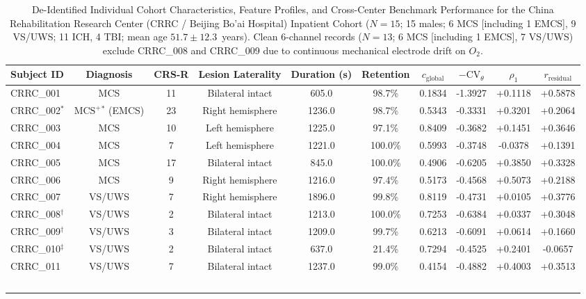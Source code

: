 \begin{table}[!ht]
\centering
\caption{De-Identified Individual Cohort Characteristics, Feature Profiles, and Cross-Center Benchmark Performance for the China Rehabilitation Research Center (CRRC / Beijing Bo'ai Hospital) Inpatient Cohort ($N=15$; 15 males; 6 MCS [including 1 EMCS], 9 VS/UWS; 11 ICH, 4 TBI; mean age $51.7 \pm 12.3$~years). Clean 6-channel records ($N=13$; 6 MCS [including 1 EMCS], 7 VS/UWS) exclude CRRC\_008 and CRRC\_009 due to continuous mechanical electrode drift on $O_2$.}
\label{tab:crrc_patient_cohort}
\vspace{-4pt}
\footnotesize
\renewcommand{\arraystretch}{0.92}
\setlength{\tabcolsep}{3.5pt}
\begin{tabular*}{\linewidth}{@{\extracolsep{\fill}}lccccccccc}
\hline
\textbf{Subject ID} & \textbf{Diagnosis} & \textbf{CRS-R} & \textbf{Lesion Laterality} & \textbf{Duration (s)} & \textbf{Retention} & $c_{\text{global}}$ & $-\mathrm{CV}_\theta$ & $\rho_1$ & $r_{\text{residual}}$ \\
\hline
CRRC\_001 & MCS & 11 & Bilateral intact & 605.0 & 98.7\% & 0.1834 & -1.3927 & +0.1118 & +0.5878 \\
CRRC\_002$^*$ & $\text{MCS}^+$$^*$ (EMCS) & 23 & Right hemisphere & 1236.0 & 98.7\% & 0.5343 & -0.3331 & +0.3201 & +0.2064 \\
CRRC\_003 & MCS & 10 & Left hemisphere & 1225.0 & 97.1\% & 0.8409 & -0.3682 & +0.1451 & +0.3646 \\
CRRC\_004 & MCS & 7 & Left hemisphere & 1221.0 & 100.0\% & 0.5993 & -0.3748 & -0.0378 & +0.1391 \\
CRRC\_005 & MCS & 17 & Bilateral intact & 845.0 & 100.0\% & 0.4906 & -0.6205 & +0.3850 & +0.3328 \\
CRRC\_006 & MCS & 9 & Right hemisphere & 1216.0 & 97.4\% & 0.5173 & -0.4568 & +0.5073 & +0.2188 \\
\hline
CRRC\_007 & VS/UWS & 7 & Right hemisphere & 1896.0 & 99.8\% & 0.8119 & -0.4731 & +0.0105 & +0.3776 \\
CRRC\_008$^\dagger$ & VS/UWS & 2 & Bilateral intact & 1213.0 & 100.0\% & 0.7253 & -0.6384 & +0.0337 & +0.3048 \\
CRRC\_009$^\dagger$ & VS/UWS & 3 & Bilateral intact & 1209.0 & 99.7\% & 0.6213 & -0.6091 & +0.0614 & +0.1660 \\
CRRC\_010$^\ddagger$ & VS/UWS & 2 & Bilateral intact & 637.0 & 21.4\% & 0.7294 & -0.4525 & +0.2401 & -0.0657 \\
CRRC\_011 & VS/UWS & 7 & Bilateral intact & 1237.0 & 99.0\% & 0.4154 & -0.4882 & +0.4003 & +0.3513 \\
$$
\end{tabular*}
\end{table}
